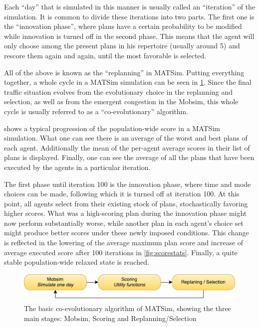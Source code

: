 Each ``day'' that is simulated in this manner is usually called an ``iteration''
of the simulation. It is common to divide these iterations into two parts. The
first one is the ``innovation phase'', where plans have a certain probability to
be modified while innovation is turned off in the second phase. This means that
the agent will only choose among the present plans in his repertoire (usually
around 5) and rescore them again and again, until the most favorable is selected.

All of the above is known as the ``replanning'' in MATSim. Putting everything
together, a whole cycle in a MATSim simulation can be seen in \cref{fig:matsimcycle}. Since the
final traffic situation evolves from the evolutionary choice in the replanning and
selection, as well as from the emergent congestion in the Mobsim, this whole
cycle is usually referred to as a ``co-evolutionary'' algorithm.

 shows a typical progression of the population-wide score in
a MATSim simulation. What one can see there is an average of the worst and best plans
of each agent. Additionally the mean of the per-agent average scores in their list of plans is displayed.
Finally, one can see the average of all the plans that have been executed
by the agents in a particular iteration.

The first phase until iteration 100 is the innovation phase, where time and mode
choices can be made, following which it is turned off at iteration 100. At this point,
all agents select from their existing stock of plans, stochastically favoring higher
scores. What was a high-scoring plan during the innovation phase might now perform substantially
worse, while another plan in each agent's choice set might produce better scores under these newly
imposed conditions. This change is reflected in the lowering of the average maximum
plan score and increase of average executed score after 100 iterations in \cref{fig:scorestats}.
Finally, a quite stable population-wide relaxed state is reached.

\begin{figure}
    \centering
    \includegraphics[width=1.0\textwidth]{figures/matsimcycle.pdf}
    \caption{The basic co-evolutionary algorithm of MATSim, showing the three main
    stages: Mobsim, Scoring and Replanning/Selection}
    \label{fig:matsimcycle}
\end{figure}

